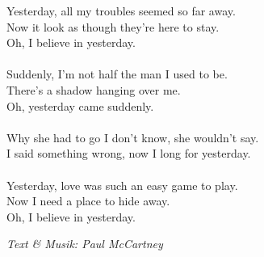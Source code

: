 \vspace{10pt}
Yesterday, all my troubles seemed so far away.\\
Now it look as though they're here to stay.\\
Oh, I believe in yesterday.\\
\\
Suddenly, I'm not half the man I used to be.\\
There's a shadow hanging over me.\\
Oh, yesterday came suddenly.\\
\\
Why she had to go I don't know, she wouldn't say.\\
I said something wrong, now I long for yesterday.\\
\\
Yesterday, love was such an easy game to play.\\
Now I need a place to hide away.\\
Oh, I believe in yesterday.\par
\vspace{10pt}
{\footnotesize\textit{Text \& Musik: Paul McCartney}}
